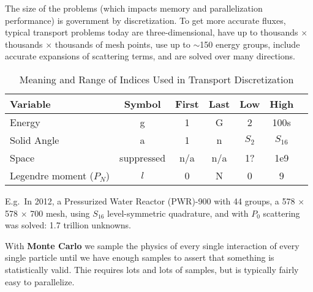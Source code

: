 \documentclass[12pt]{article}
\begin{document}
The size of the problems (which impacts memory and parallelization performance) is government by discretization. To get more accurate fluxes, typical transport problems today are three-dimensional, have up to thousands $\times$ thousands $\times$ thousands of mesh points, use up to $\sim$150 energy groups, include accurate expansions of scattering terms, and are solved over many directions. 
%
\begin{table}[!h]
\caption{Meaning and Range of Indices Used in Transport Discretization}
\begin{center}
\begin{tabular}{l c c c c c c}
\hline
Variable & Symbol & First & Last & Low & High \\[0.5ex]
\hline
Energy & g & 1 & G & 2 & 100s \\
Solid Angle & a & 1 & n & $S_2$ & $S_{16}$ \\
Space & suppressed & n/a & n/a & 1? & 1e9 \\
Legendre moment ($P_{N}$) & $l$ & 0 & N & 0 & 9 \\
\hline
\end{tabular}
\end{center}
\label{table:index}
\end{table}
%
E.g.\ In 2012, a Pressurized Water Reactor (PWR)-900 with 44 groups, a 578 $\times$ 578 $\times$ 700 mesh, using $S_{16}$ level-symmetric quadrature, and with $P_{0}$ scattering was solved: 1.7 trillion unknowns.

With \textbf{Monte Carlo} we sample the physics of every single interaction of every single particle until we have enough samples to assert that something is statistically valid. Thie requires lots and lots of samples, but is typically fairly easy to parallelize.
\end{document}
